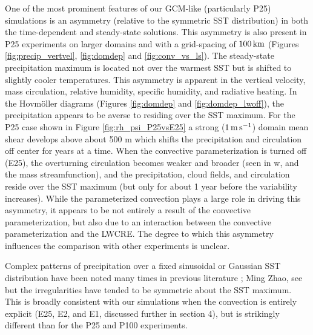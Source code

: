 \documentclass[draft]{agujournal2019}
\begin{document}
%
One of the most prominent features of our GCM-like (particularly P25) simulations is an asymmetry (relative to the 
symmetric SST distribution) in both the time-dependent and steady-state solutions.  
This asymmetry is also present in P25 experiments on larger domains and with a grid-spacing of $100 \, \rm{km}$ 
(Figures  \ref{fig:precip_vertvel}, \ref{fig:domdep} and  \ref{fig:conv_vs_ls}). 
The steady-state precipitation maximum is located  not over the warmest SST but is shifted to slightly cooler temperatures.  
This asymmetry is apparent in the vertical velocity, mass circulation, relative humidity, specific humidity, and radiative heating.  
In the Hovm{\"o}ller diagrams (Figures \ref{fig:domdep} and \ref{fig:domdep_lwoff}), the precipitation appears to be averse 
to residing over the SST maximum.  
For the P25 case shown in Figure \ref{fig:rh_psi_P25vsE25} a strong ($1 \, \rm{m \, s^{-1}}$) domain
mean shear develops above about 500 m which shifts the precipitation and circulation off center for years at a time.  
When the convective parameterization is turned off (E25), the overturning circulation 
becomes weaker and broader (seen in w, and the mass streamfunction), and the precipitation, cloud fields, and 
circulation reside over the SST maximum (but only for about 1 year before the variability 
increases).    
While the parameterized convection plays a large role in driving this asymmetry, it appears to be not entirely a 
result of the convective parameterization, but also due to an interaction between the convective 
parameterization and the LWCRE.   The degree to which this asymmetry influences the comparison with other 
experiments is unclear.    

Complex patterns of precipitation over a fixed sinusoidal or Gaussian SST distribution have been noted 
many times in previous literature \cite{Bretherton_etal_2006, Wofsy_Kuang_2012}; Ming Zhao, see 
but the irregularities have tended to be symmetric about the SST maximum.  This is broadly consistent 
with our simulations when the convection is entirely explicit (E25, E2, and E1, discussed further in section 
4), but is strikingly different than for the P25 and P100 experiments.      


\end{document}

